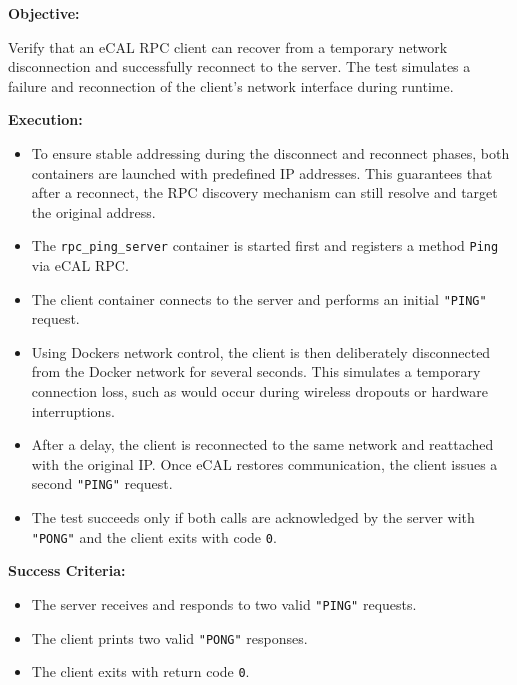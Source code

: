 \textbf{Objective:}

\vspace{0.4em}
Verify that an eCAL RPC client can recover from a temporary network disconnection and successfully reconnect to the server. The test simulates a failure and reconnection of the client's network interface during runtime.

\vspace{0.5em}
\textbf{Execution:}
\begin{itemize}
	\item To ensure stable addressing during the disconnect and reconnect phases, both containers are launched with predefined IP addresses. This guarantees that after a reconnect, the RPC discovery mechanism can still resolve and target the original address.

	\item The \texttt{rpc\_ping\_server} container is started first and registers a method \texttt{Ping} via eCAL RPC.
	
	\item The client container connects to the server and performs an initial \texttt{"PING"} request.
	
	\item Using Dockers network control, the client is then deliberately disconnected from the Docker network for several seconds. This simulates a temporary connection loss, such as would occur during wireless dropouts or hardware interruptions.
	
	\item After a delay, the client is reconnected to the same network and reattached with the original IP. Once eCAL restores communication, the client issues a second \texttt{"PING"} request.
	
	\item The test succeeds only if both calls are acknowledged by the server with \texttt{"PONG"} and the client exits with code \texttt{0}.
\end{itemize}


\vspace{0.4em}
\textbf{Success Criteria:}
\begin{itemize}
	\item The server receives and responds to two valid \texttt{"PING"} requests.
	\item The client prints two valid \texttt{"PONG"} responses.
	\item The client exits with return code \texttt{0}.
\end{itemize}

